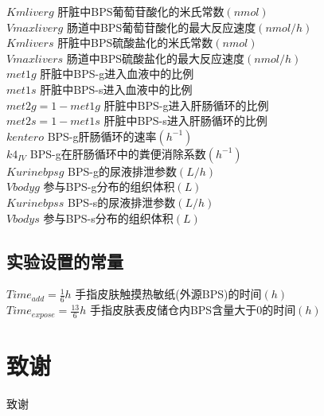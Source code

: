\documentclass[a4paper,punct=banjiao,twoside]{ctexrep}
\theoremstyle{plain}
\theoremstyle{definition}
\theoremstyle{remark}
\begin{document}
$ Kmliverg$ {\hfill  肝脏中BPS葡萄苷酸化的米氏常数$(nmol)$}\\
$Vmaxliverg$ {\hfill  肠道中BPS葡萄苷酸化的最大反应速度$(nmol/h)$}\\
$ Kmlivers$ {\hfill  肝脏中BPS硫酸盐化的米氏常数$(nmol)$}\\
$Vmaxlivers$ {\hfill  肠道中BPS硫酸盐化的最大反应速度$(nmol/h)$}\\
$met1g $ {\hfill  肝脏中BPS-g进入血液中的比例}\\
$ met1s$ {\hfill  肝脏中BPS-s进入血液中的比例}\\
$met2g = 1 -  met1g$ {\hfill  肝脏中BPS-g进入肝肠循环的比例}\\
$ met2s= 1 -  met1s$ {\hfill  肝脏中BPS-s进入肝肠循环的比例}\\
$ kentero$ {\hfill  BPS-g肝肠循环的速率$(h^{-1})$}\\
$k4_{IV} $ {\hfill  BPS-g在肝肠循环中的粪便消除系数$(h^{-1})$}\\
$ Kurinebpsg$ {\hfill  BPS-g的尿液排泄参数$(L/h)$}\\
$Vbodyg  $ {\hfill  参与BPS-g分布的组织体积$(L)$}\\
$ Kurinebpss$ {\hfill  BPS-s的尿液排泄参数$(L/h)$}\\
$ Vbodys$ {\hfill  参与BPS-s分布的组织体积$(L)$}

\section*{实验设置的常量}
\noindent$Time_{add}=\frac{1}{6}h$ {\hfill  手指皮肤触摸热敏纸(外源BPS)的时间$(h)$}\\
$Time_{expose}=\frac{13}{6}h$ {\hfill  手指皮肤表皮储仓内BPS含量大于0的时间$(h)$}\\
\clearpage
\mbox{}
\thispagestyle{empty}


% 



\clearpage
\mbox{}
\thispagestyle{empty}

\chapter*{致\quad 谢}
\normalsize
致谢
\end{document}
